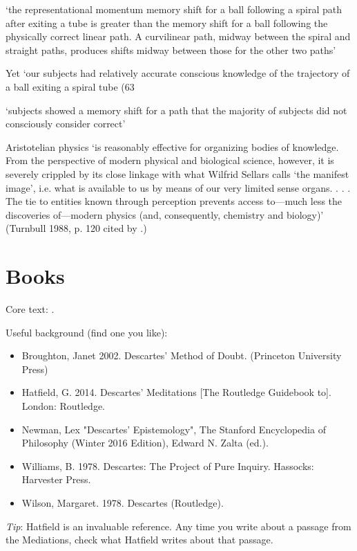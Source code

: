 \documentclass[12pt]{extarticle}
\begin{document}
\begin{multicols*}{3}
‘the representational momentum memory shift for a ball following a spiral path after exiting a tube is greater than the memory shift for a ball following the physically correct linear path. A curvilinear path, midway between the spiral and straight paths, produces shifts midway between those for the other two paths’
\citep[p.~975]{freyd:1994_representational}
 
Yet ‘our subjects had relatively accurate conscious knowledge of the trajectory of a ball exiting 
a spiral tube (63%
\citep[p.~975]{freyd:1994_representational}
 
‘subjects showed a memory shift for a path that the majority of subjects did not consciously consider correct’
\citep[p.~975]{freyd:1994_representational}
 
Aristotelian physics ‘is reasonably effective for organizing bodies of knowledge. From the 
perspective of modern physical and biological science, however, it is severely crippled by 
its close linkage with what Wilfrid Sellars calls ‘the manifest image’, i.e. what is available 
to us by means of our very limited sense organs. . . . The tie to entities known through 
perception prevents access to—much less the discoveries of—modern physics (and, consequently, 
chemistry and biology)’
(Turnbull 1988, p. 120 cited by \citealp{bennett:2003_learning}.)
 
\section{Books}
Core text: \citep{descartes:1985_csm2}.

Useful background (find one you like):
\begin{itemize}
\item Broughton, Janet 2002. Descartes' Method of Doubt. (Princeton University Press)
\item Hatfield, G. 2014. Descartes’ Meditations [The Routledge Guidebook to]. London: Routledge. 
\item Newman, Lex "Descartes' Epistemology", The Stanford Encyclopedia of Philosophy (Winter 2016 Edition), Edward N. Zalta (ed.).
\item Williams, B. 1978. Descartes: The Project of Pure Inquiry. Hassocks: Harvester Press. 
\item Wilson, Margaret. 1978. Descartes (Routledge).
\end{itemize}
\emph{Tip}: Hatfield is an invaluable reference. Any time you write about a 
passage from the Mediations, check what Hatfield writes about that passage.


    
    







\footnotesize


\end{multicols*}
\end{document}
